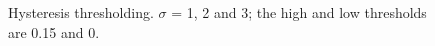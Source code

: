 \documentclass[a4paper]{article}
\begin{document}
\begin{figure}[h]
\begin{subfigure}{0.33\textwidth}
\end{subfigure}

\caption{Hysteresis thresholding. $\sigma$ = 1, 2 and 3; the high and low thresholds are 0.15 and 0.}

\end{figure}
\end{document}
